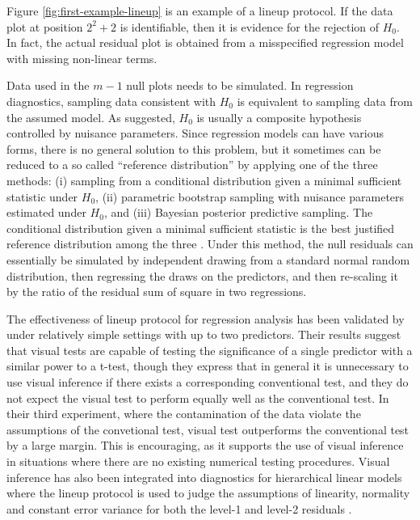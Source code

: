 \documentclass[]{interact}
\theoremstyle{plain}%
\theoremstyle{definition}
\theoremstyle{remark}
\begin{document}
Figure \ref{fig:first-example-lineup} is an example of a lineup
protocol. If the data plot at position \(2^2 + 2\) is identifiable, then
it is evidence for the rejection of \(H_0\). In fact, the actual
residual plot is obtained from a misspecified regression model with
missing non-linear terms.

Data used in the \(m - 1\) null plots needs to be simulated. In
regression diagnostics, sampling data consistent with \(H_0\) is
equivalent to sampling data from the assumed model. As
\citet{buja2009statistical} suggested, \(H_0\) is usually a composite
hypothesis controlled by nuisance parameters. Since regression models
can have various forms, there is no general solution to this problem,
but it sometimes can be reduced to a so called ``reference
distribution'' by applying one of the three methods: (i) sampling from a
conditional distribution given a minimal sufficient statistic under
\(H_0\), (ii) parametric bootstrap sampling with nuisance parameters
estimated under \(H_0\), and (iii) Bayesian posterior predictive
sampling. The conditional distribution given a minimal sufficient
statistic is the best justified reference distribution among the three
\citep{buja2009statistical}. Under this method, the null residuals can
essentially be simulated by independent drawing from a standard normal
random distribution, then regressing the draws on the predictors, and
then re-scaling it by the ratio of the residual sum of square in two
regressions.

The effectiveness of lineup protocol for regression analysis has been
validated by \citet{majumder2013validation} under relatively simple
settings with up to two predictors. Their results suggest that visual
tests are capable of testing the significance of a single predictor with
a similar power to a t-test, though they express that in general it is
unnecessary to use visual inference if there exists a corresponding
conventional test, and they do not expect the visual test to perform
equally well as the conventional test. In their third experiment, where
the contamination of the data violate the assumptions of the convetional
test, visual test outperforms the conventional test by a large margin.
This is encouraging, as it supports the use of visual inference in
situations where there are no existing numerical testing procedures.
Visual inference has also been integrated into diagnostics for
hierarchical linear models where the lineup protocol is used to judge
the assumptions of linearity, normality and constant error variance for
both the level-1 and level-2 residuals \citep[\citet{loy2014hlmdiag} and
\citet{loy2015you}]{loy2013diagnostic}.
\end{document}
